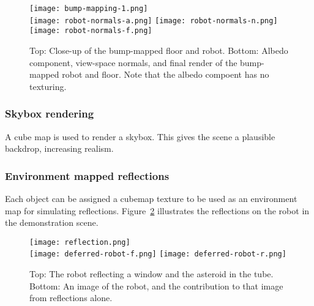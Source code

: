 \documentclass[11pt]{scrartcl} %
\begin{document}
            \begin{figure}%
                \centering
                \texttt{[image: bump-mapping-1.png]}
                \\
                \texttt{[image: robot-normals-a.png]}
                \texttt{[image: robot-normals-n.png]}
                \texttt{[image: robot-normals-f.png]}
                \caption[Textured spaceship]{
                    Top: Close-up of the bump-mapped floor and robot.
                    Bottom: Albedo component, view-space normals, and final render of the bump-mapped robot and floor. Note that the albedo compoent has no texturing.
                }
                \label{fig:bump-mapping}
            \end{figure}

        \subsubsection{Skybox rendering}

            A cube map is used to render a skybox. This gives the scene a
            plausible backdrop, increasing realism.

        \subsubsection{Environment mapped reflections}

            Each object can be assigned a cubemap texture to be used as an
            environment map for simulating reflections.
            Figure~\ref{fig:reflection} illustrates the reflections on the robot in the demonstration scene.

            \begin{figure}%
                \centering
                \texttt{[image: reflection.png]}
                \\
                \texttt{[image: deferred-robot-f.png]}
                \texttt{[image: deferred-robot-r.png]}
                \caption[Textured spaceship]{
                    Top: The robot reflecting a window and the asteroid in the tube.
                    Bottom: An image of the robot, and the contribution to that image from reflections alone.
                }
                \label{fig:reflection}
            \end{figure}
\end{document}
